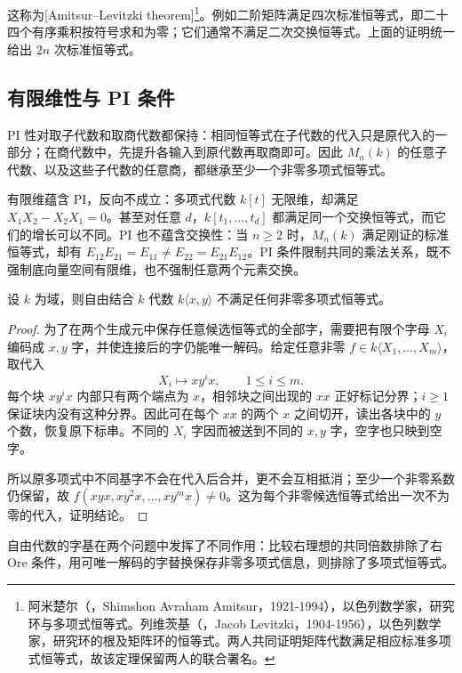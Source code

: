 这称为[Amitsur–Levitzki theorem]\footnote{阿米楚尔（，Shimshon Avraham Amitsur，1921-1994），以色列数学家，研究环与多项式恒等式。列维茨基（，Jacob Levitzki，1904-1956），以色列数学家，研究环的根及矩阵环的恒等式。两人共同证明矩阵代数满足相应标准多项式恒等式，故该定理保留两人的联合署名。}。例如二阶矩阵满足四次标准恒等式，即二十四个有序乘积按符号求和为零；它们通常不满足二次交换恒等式。上面的证明统一给出 \(2n\) 次标准恒等式。

\subsection{有限维性与 PI 条件}
\label{b2:subsec:1903:03}

PI 性对取子代数和取商代数都保持：相同恒等式在子代数的代入只是原代入的一部分；在商代数中，先提升各输入到原代数再取商即可。因此 \(M_n(k)\) 的任意子代数、以及这些子代数的任意商，都继承至少一个非零多项式恒等式。

\ProseParagraphBreak
有限维蕴含 PI，反向不成立：多项式代数 \(k[t]\) 无限维，却满足 \(X_1X_2-X_2X_1=0\)。甚至对任意 \(d\)，\(k[t_1,\ldots,t_d]\) 都满足同一个交换恒等式，而它们的增长可以不同。PI 也不蕴含交换性：当 \(n\ge2\) 时，\(M_n(k)\) 满足刚证的标准恒等式，却有 \(E_{12}E_{21}=E_{11}\ne E_{22}=E_{21}E_{12}\)。PI 条件限制共同的乘法关系，既不强制底向量空间有限维，也不强制任意两个元素交换。

\begin{proposition}\label{b2:prop:free-algebra-not-pi}
	设 \(k\) 为域，则自由结合 \(k\) 代数 \(k\langle x,y\rangle\) 不满足任何非零多项式恒等式。
\end{proposition}
\begin{proof}
	为了在两个生成元中保存任意候选恒等式的全部字，需要把有限个字母 \(X_i\) 编码成 \(x,y\) 字，并使连接后的字仍能唯一解码。给定任意非零 \(f\in k\langle X_1,\ldots,X_m\rangle\)，取代入
	\[
		X_i\longmapsto xy^ix,\qquad 1\le i\le m.
	\]
	每个块 \(xy^ix\) 内部只有两个端点为 \(x\)，相邻块之间出现的 \(xx\) 正好标记分界；\(i\ge1\) 保证块内没有这种分界。因此可在每个 \(xx\) 的两个 \(x\) 之间切开，读出各块中的 \(y\) 个数，恢复原下标串。不同的 \(X_i\) 字因而被送到不同的 \(x,y\) 字，空字也只映到空字。

	所以原多项式中不同基字不会在代入后合并，更不会互相抵消；至少一个非零系数仍保留，故 \(f(xyx,xy^2x,\ldots,xy^mx)\ne0\)。这为每个非零候选恒等式给出一次不为零的代入，证明结论。
\end{proof}

自由代数的字基在两个问题中发挥了不同作用：比较右理想的共同倍数排除了右 Ore 条件，用可唯一解码的字替换保存非零多项式信息，则排除了多项式恒等式。
